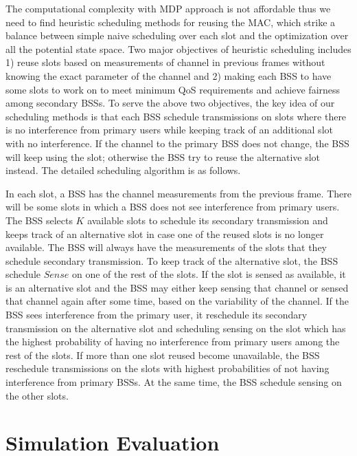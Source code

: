 \documentclass[10pt, conference, letterpaper]{IEEEtran}
\begin{document}
The computational complexity with MDP approach is not affordable thus we need to find heuristic scheduling methods for reusing the MAC, which strike a balance between simple naive scheduling over each slot and the optimization over all the potential state space. Two major objectives of heuristic scheduling includes 1) reuse slots based on measurements of channel in previous frames without knowing the exact parameter of the channel and 2) making each BSS to have some slots to work on to meet minimum QoS requirements and achieve fairness among secondary BSSs. To serve the above two objectives, the key idea of our scheduling methods is that each BSS schedule transmissions on slots where there is no interference from primary users while keeping track of an additional slot with no interference. If the channel to the primary BSS does not change, the BSS will keep using the slot; otherwise the BSS try to reuse the alternative slot instead. The detailed scheduling algorithm is as follows. 


In each slot, a BSS has the channel measurements from the previous frame. There will be some slots in which a BSS does not see interference from primary users. The BSS selects $K$ available slots to schedule its secondary transmission and keeps track of an alternative slot in case one of the reused slots is no longer available. The BSS will always have the measurements of the slots that they schedule secondary transmission. To keep track of the alternative slot, the BSS schedule $Sense$ on one of the rest of the slots. If the slot is sensed as available, it is an alternative slot and the BSS may either keep sensing that channel or sensed that channel again after some time, based on the variability of the channel. If the BSS sees interference from the primary user, it reschedule its secondary transmission on the alternative slot and scheduling sensing on the slot which has the highest probability of having no interference from primary users among the rest of the slots. If more than one slot reused become unavailable, the BSS reschedule transmissions on the slots with highest probabilities of not having interference from primary BSSs. At the same time, the BSS schedule sensing on the other slots.  






\section{Simulation Evaluation}
\end{document}
